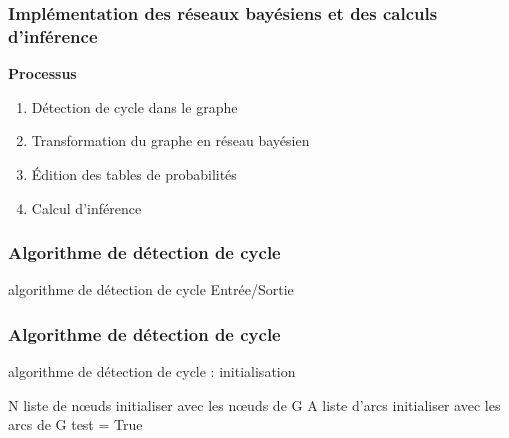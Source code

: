 \documentclass{beamer}
\begin{document}
	\begin{frame}
	\frametitle{Implémentation des réseaux bayésiens et des calculs d'inférence }
	
	\textbf{Processus}
	
	\begin{enumerate}
	\item Détection de cycle dans le graphe 
	\item Transformation du graphe en réseau bayésien
	\item Édition des tables de probabilités 
	\item Calcul d'inférence 
	\end{enumerate}		
	
	\end{frame}
	
	
	
	\begin{frame}
	\frametitle{Algorithme de détection de cycle}
		
		\begin{block}{algorithme de détection de cycle Entrée/Sortie}
		
		\begin{algorithm}[H]
\end{algorithm}
		
		\end{block}
	
	\end{frame}

		\begin{frame}
	\frametitle{Algorithme de détection de cycle}
		
		\begin{block}{algorithme de détection de cycle : initialisation}
		
		\begin{algorithm}[H]
 N liste de nœuds initialiser avec les nœuds de G\;
 A liste d'arcs initialiser avec les arcs de G\;
 test = True\;
\end{algorithm}
		
		\end{block}
	
\end{frame}
	
\end{document}
